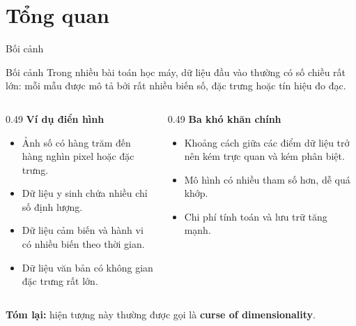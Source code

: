 \section{Tổng quan}

\begin{frame}[shrink=10]{Bối cảnh}
    \begin{block}{Bối cảnh}
    Trong nhiều bài toán học máy, dữ liệu đầu vào thường có số chiều rất lớn:
    mỗi mẫu được mô tả bởi rất nhiều biến số, đặc trưng hoặc tín hiệu đo đạc.
    \end{block}

    \vspace{0.2cm}
    \small
    \begin{columns}[T]
        \begin{column}{0.49\textwidth}
            \textbf{Ví dụ điển hình}
            \begin{itemize}
                \item Ảnh số có hàng trăm đến hàng nghìn pixel hoặc đặc trưng.
                \item Dữ liệu y sinh chứa nhiều chỉ số định lượng.
                \item Dữ liệu cảm biến và hành vi có nhiều biến theo thời gian.
                \item Dữ liệu văn bản có không gian đặc trưng rất lớn.
            \end{itemize}
        \end{column}
        \begin{column}{0.49\textwidth}
            \textbf{Ba khó khăn chính}
            \begin{itemize}
                \item Khoảng cách giữa các điểm dữ liệu trở nên kém trực quan và kém phân biệt.
                \item Mô hình có nhiều tham số hơn, dễ quá khớp.
                \item Chi phí tính toán và lưu trữ tăng mạnh.
            \end{itemize}
        \end{column}
    \end{columns}

    \vspace{0.15cm}
    \smallskip
    \textbf{Tóm lại:} hiện tượng này thường được gọi là \textbf{curse of dimensionality}.
\end{frame}

